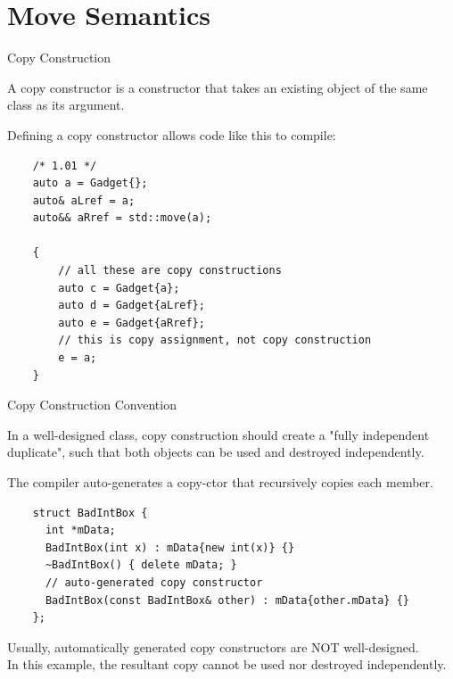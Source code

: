 
\section{Move Semantics}

\begin{frame}[fragile]{Copy Construction}
  \begin{sqt:definition}
    A copy constructor is a constructor that takes an existing object of the same class as its argument.
  \end{sqt:definition}
  Defining a copy constructor allows code like this to compile:
  \begin{verbatim}
    /* 1.01 */
    auto a = Gadget{};
    auto& aLref = a;
    auto&& aRref = std::move(a);

    {
        // all these are copy constructions
        auto c = Gadget{a};
        auto d = Gadget{aLref};
        auto e = Gadget{aRref};
        // this is copy assignment, not copy construction
        e = a;
    }
  \end{verbatim}
\end{frame}

\begin{frame}[fragile]{Copy Construction Convention}
  \begin{sqt:result}
    In a well-designed class, copy construction should create a "fully independent duplicate", such that
    both objects can be used and destroyed independently.
  \end{sqt:result}

  The compiler auto-generates a copy-ctor that recursively copies each member.
  \begin{verbatim}
    struct BadIntBox {
      int *mData;
      BadIntBox(int x) : mData{new int(x)} {}
      ~BadIntBox() { delete mData; }
      // auto-generated copy constructor
      BadIntBox(const BadIntBox& other) : mData{other.mData} {}
    };
  \end{verbatim}
  Usually, automatically generated copy constructors are NOT well-designed.\\
  In this example, the resultant copy cannot be used nor destroyed independently.
\end{frame}

